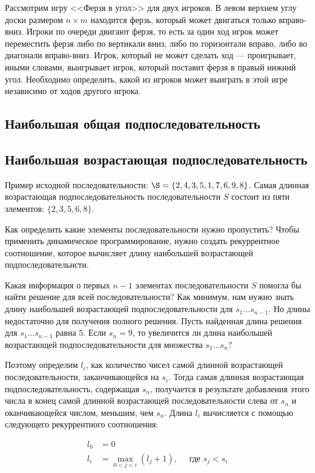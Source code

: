 \documentclass[14pt]{book}
\begin{document}
Рассмотрим игру <<Ферзя в угол>> для двух игроков. В левом верхнем углу доски размером $n \times m$ 
находится ферзь, который может двигаться только вправо-вниз. Игроки по очереди двигают ферзя, то есть 
за один ход игрок может переместить ферзя либо по вертикали вниз, либо по горизонтали вправо, либо во 
диагонали вправо-вниз. Игрок, который не может сделать ход — проигрывает, иными словами, выигрывает 
игрок, который поставит ферзя в правый нижний угол. Необходимо определить, какой из игроков может 
выиграть в этой игре независимо от ходов другого игрока.

\subsection{Наибольшая общая подпоследовательность}

\subsection{Наибольшая возрастающая подпоследовательность}

Пример исходной последовательности: $\S=\{2,4,3,5,1,7,6,9,8\}$. Самая длинная возрастающая
подпоследовательность последовательности $S$ состоит из пяти элементов: $\{2,3,5,6,8\}$.

Как определить какие элементы последовательности нужно пропустить? Чтобы применить динамическое
программирование, нужно создать рекуррентное соотношение, которое вычисляет длину
наибольшей возрастающей подпоследовательнсти.

Какая информация о первых $n-1$ элементах последовательности $S$ помогла бы найти решение для
всей последовательности? Как минимум, нам нужно знать длину наибольшей возрастающей 
подпоследовательности для $s_1 \ldots s_{n-1}$. Но длины недостаточно для получения полного
решения. Пусть найденная длина решения для $s_1 \ldots s_{n-1}$ равна $5$. Если $s_n = 9$,
то увеличится ли длина наибольшей возрастающей подпоследовательности для множества
$s_1 \ldots s_n$?

Поэтому определим $l_i$, как количество чисел самой длинной возрастающей последовательности,
заканчивающейся на $s_i$. Тогда самая длинная возрастающая подпоследовательность, содержащая
$s_n$, получается в результате добавления этого числа в конец самой длинной возрастающей
последовательности слева от $s_n$ и оканчивающейся числом, меньшим, чем $s_n$. Длина $l_i$
вычисляется с помощью следующего рекуррентного соотношения:

\begin{align*}
l_0 &= 0 \\
l_i &= \max_{0<j<i}(l_j + 1), \quad \text{ где $s_j < s_i$}
\end{align*}
\end{document}
